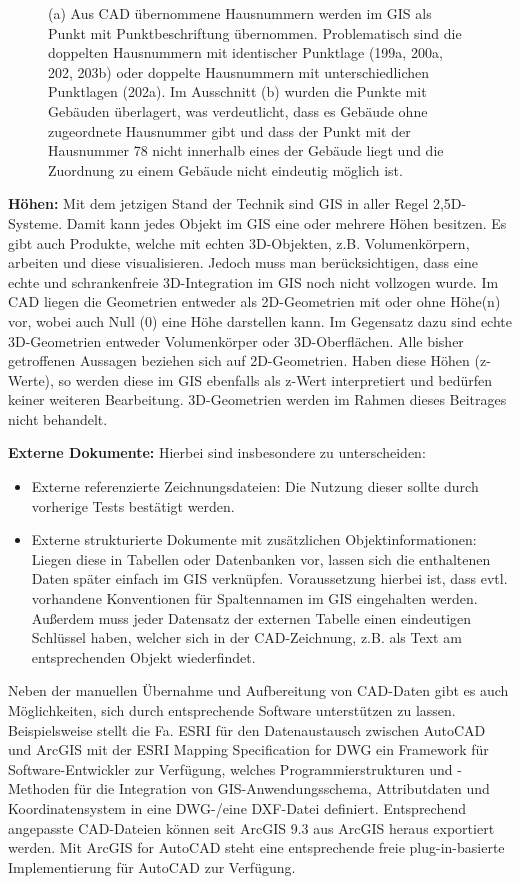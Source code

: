 \begin{figure}[h!tbp]
\begin{subfigure}{.3\textwidth}
  \caption{}
\end{subfigure}
\caption{(a) Aus CAD übernommene Hausnummern werden im GIS als Punkt mit Punktbeschriftung übernommen. Problematisch sind die doppelten Hausnummern mit identischer Punktlage (199a, 200a, 202, 203b) oder doppelte Hausnummern mit unterschiedlichen Punktlagen (202a). Im Ausschnitt (b) wurden die Punkte mit Gebäuden überlagert, was verdeutlicht, dass es Gebäude ohne zugeordnete Hausnummer gibt und dass der Punkt mit der Hausnummer 78 nicht innerhalb eines der Gebäude liegt und die Zuordnung zu einem Gebäude nicht eindeutig möglich ist.}
\label{abb:vektor_hausnummern}
\end{figure}

{\bfseries Höhen:} Mit dem jetzigen Stand der Technik sind GIS in aller Regel 2,5D-Systeme. Damit kann jedes Objekt im GIS eine oder mehrere Höhen besitzen. Es gibt auch Produkte, welche mit echten 3D-Objekten, z.B.  Volumenkörpern, arbeiten und diese visualisieren. Jedoch muss man berücksichtigen, dass eine echte und schrankenfreie 3D-Integration im GIS noch nicht vollzogen wurde. Im CAD liegen die Geometrien entweder als 2D-Geometrien mit oder ohne Höhe(n) vor, wobei auch Null (0) eine Höhe darstellen kann. Im Gegensatz dazu sind echte 3D-Geometrien entweder Volumenkörper oder 3D-Oberflächen. Alle bisher getroffenen Aussagen beziehen sich auf 2D-Geometrien. Haben diese Höhen (z-Werte), so werden diese im GIS ebenfalls als z-Wert interpretiert und bedürfen keiner weiteren Bearbeitung. 3D-Geometrien werden im Rahmen dieses Beitrages nicht behandelt.

{\bfseries Externe Dokumente:} Hierbei sind insbesondere zu unterscheiden:
\begin{itemize}
	\item Externe referenzierte Zeichnungsdateien: Die Nutzung dieser sollte durch vorherige Tests bestätigt werden.
	\item Externe strukturierte Dokumente mit zusätzlichen Objektinformationen: Liegen diese in Tabellen oder Datenbanken vor, lassen sich die enthaltenen Daten später einfach im GIS verknüpfen. Voraussetzung hierbei ist, dass evtl. vorhandene Konventionen für Spaltennamen im GIS eingehalten werden. Außerdem muss jeder Datensatz der externen Tabelle einen eindeutigen Schlüssel haben, welcher sich in der CAD-Zeichnung, z.B. als Text am entsprechenden Objekt wiederfindet.
\end{itemize}

Neben der manuellen Übernahme und Aufbereitung von CAD-Daten gibt es auch Möglichkeiten, sich durch entsprechende Software unterstützen zu lassen. Beispielsweise stellt die Fa. ESRI für den Datenaustausch zwischen AutoCAD und ArcGIS mit der ESRI Mapping Specification for DWG ein Framework für Software-Entwickler zur Verfügung, welches Programmierstrukturen und -Methoden für die Integration von GIS-Anwendungsschema, Attributdaten und Koordinatensystem in eine DWG-/eine DXF-Datei definiert. Entsprechend angepasste CAD-Dateien können seit ArcGIS 9.3 aus ArcGIS heraus exportiert werden. Mit ArcGIS for AutoCAD steht eine entsprechende freie plug-in-basierte Implementierung für AutoCAD zur Verfügung.
 
